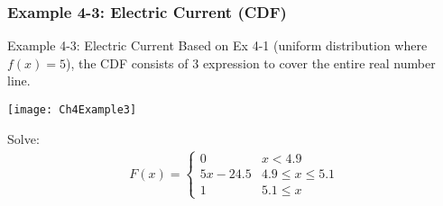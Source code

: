 \documentclass[../INDE315.tex]{subfiles}
\begin{document}
\subsubsection*{Example 4-3: Electric Current (CDF)}
\begin{exmp} Example 4-3: Electric Current
    Based on Ex 4-1 (uniform distribution where $f(x) = 5$), the CDF consists of 3 expression to cover the entire real number line.
    \begin{center}
        \texttt{[image: Ch4Example3]}
    \end{center}
\end{exmp}
Solve:
\begin{equation*}
    \begin{aligned}
        F(x) = 
            \begin{cases}
                0 & x < 4.9 \\
                5x - 24.5 & 4.9 \leq x \leq 5.1 \\
                1 & 5.1 \leq x 
            \end{cases}
    \end{aligned}
\end{equation*}
\end{document}
